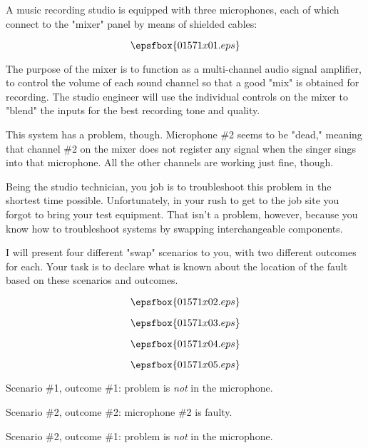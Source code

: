 

A music recording studio is equipped with three microphones, each of which connect to the "mixer" panel by means of shielded cables:

$$\epsfbox{01571x01.eps}$$

The purpose of the mixer is to function as a multi-channel audio signal amplifier, to control the volume of each sound channel so that a good "mix" is obtained for recording.  The studio engineer will use the individual controls on the mixer to "blend" the inputs for the best recording tone and quality.

This system has a problem, though.  Microphone \#2 seems to be "dead," meaning that channel \#2 on the mixer does not register any signal when the singer sings into that microphone.  All the other channels are working just fine, though.

Being the studio technician, you job is to troubleshoot this problem in the shortest time possible.  Unfortunately, in your rush to get to the job site you forgot to bring your test equipment.  That isn't a problem, however, because you know how to troubleshoot systems by swapping interchangeable components.

I will present four different "swap" scenarios to you, with two different outcomes for each.  Your task is to declare what is known about the location of the fault based on these scenarios and outcomes.

$$\epsfbox{01571x02.eps}$$

$$\epsfbox{01571x03.eps}$$

$$\epsfbox{01571x04.eps}$$

$$\epsfbox{01571x05.eps}$$







Scenario \#1, outcome \#1: problem is {\it not} in the microphone.

\vskip 5pt

Scenario \#2, outcome \#2: microphone \#2 is faulty.

\vskip 20pt

Scenario \#2, outcome \#1: problem is {\it not} in the microphone.

